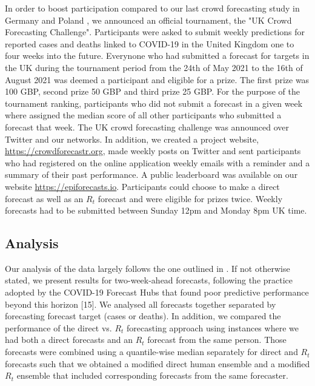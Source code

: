 \documentclass[10pt,a4paper,twocolumn]{article}
\begin{document}
In order to boost participation compared to our last crowd forecasting study in Germany and Poland \citep{bosseComparingHumanModelbased2022}, we announced an official tournament, the "UK Crowd Forecasting Challenge". Participants were asked to submit weekly predictions for reported cases and deaths linked to COVID-19 in the United Kingdom one to four weeks into the future. Everynone who had submitted a forecast for targets in the UK during the tournament period from the 24th of May 2021 to the 16th of August 2021 was deemed a participant and eligible for a prize. The first prize was 100 GBP, second prize 50 GBP and third prize 25 GBP. For the purpose of the tournament ranking, participants who did not submit a forecast in a given week where assigned the median score of all other participants who submitted a forecast that week. The UK crowd forecasting challenge was announced over Twitter and our networks. 
In addition, we created a project website, \url{https://crowdforecastr.org}, made weekly posts on Twitter and sent participants who had registered on the online application weekly emails with a reminder and a summary of their past performance. A public leaderboard was available on our website \url{https://epiforecasts.io}. Participants could choose to make a direct forecast as well as an $R_t$ forecast and were eligible for prizes twice. Weekly forecasts had to be submitted between Sunday 12pm and Monday 8pm UK time. 


\subsection*{Analysis}

Our analysis of the data largely follows the one outlined in \citet{bosseComparingHumanModelbased2022}. If not otherwise stated, we present results for two-week-ahead forecasts, following the practice adopted by the COVID-19 Forecast Hubs that found poor predictive performance beyond this horizon [15]. We analysed all forecasts together separated by forecasting forecast target (cases or deaths). In addition, we compared the performance of the direct vs. $R_t$ forecasting approach using instances where we had both a direct forecasts and an $R_t$ forecast from the same person. Those forecasts were combined using a quantile-wise median separately for direct and $R_t$ forecasts such that we obtained a modified direct human ensemble and a modified $R_t$ ensemble that included corresponding forecasts from the same forecaster. 
\end{document}
